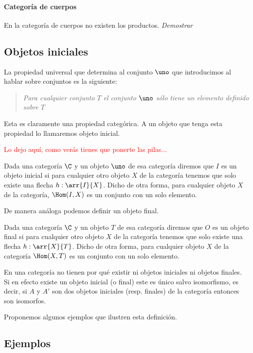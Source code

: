 \paragraph{Categoría de cuerpos}
En la categoría de cuerpos no existen los productos.
\textit{Demostrar}




\subsection{Objetos iniciales}

La propiedad universal que determina al conjunto $\uno$ que introducimos al hablar sobre conjuntos es la siguiente:
\begin{quote}
\emph{Para cualquier conjunto $T$ el conjunto $\uno$ sólo tiene un elemento definido sobre $T$}
\end{quote}
Esta es claramente una propiedad categórica. A un objeto que tenga esta propiedad lo llamaremos objeto inicial.


\textcolor{red}{Lo dejo aquí, como verás tienes que ponerte las pilas...}



\begin{definition}
	Dada una categoría $\C$ y un objeto $\uno$ de esa categoría
	diremos que $I$ es un objeto inicial si para cualquier otro objeto
	$X$ de la categoría tenemos que solo existe una flecha
	$h : \arr{I}{X}$. Dicho de otra forma, para cualquier objeto $X$
	de la categoría, $\Hom(I, X)$ es un conjunto con un solo elemento.
\end{definition}
De manera análoga podemos definir un objeto final.
\begin{definition}
	Dada una categoría $\C$ y un objeto $T$ de esa categoría diremos
	que $O$ es un objeto final si para cualquier otro objeto
	$X$ de la categoría tenemos que solo existe una flecha
	$h: \arr{X}{T}$. Dicho de otra forma, para cualquier objeto $X$
	de la categoría $\Hom(X, T)$ es un conjunto con un solo elemento.
\end{definition}
En una categoría no tienen por qué existir ni objetos iniciales
ni objetos finales. Si en efecto existe un objeto inicial (o final)
este es único salvo isomorfismo, es decir, si $A$ y $A'$ son dos
objetos iniciales (resp. finales) de la categoría entonces son
isomorfos.

Proponemos algunos ejemplos que ilustren esta definición.

\subsection{Ejemplos}
